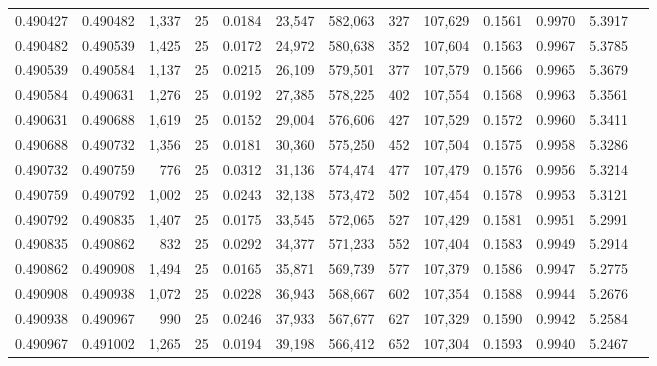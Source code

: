 \begin{tabular}{rrrrrrrrrrrrr}
0.490427 & 0.490482 & 1,337 &  25 &                                     0.0184 &  23,547 & 582,063 &     327 & 107,629 & 0.1561 & 0.9970 & 5.3917 \\
0.490482 & 0.490539 & 1,425 &  25 &                                     0.0172 &  24,972 & 580,638 &     352 & 107,604 & 0.1563 & 0.9967 & 5.3785 \\
0.490539 & 0.490584 & 1,137 &  25 &                                     0.0215 &  26,109 & 579,501 &     377 & 107,579 & 0.1566 & 0.9965 & 5.3679 \\
0.490584 & 0.490631 & 1,276 &  25 &                                     0.0192 &  27,385 & 578,225 &     402 & 107,554 & 0.1568 & 0.9963 & 5.3561 \\
0.490631 & 0.490688 & 1,619 &  25 &                                     0.0152 &  29,004 & 576,606 &     427 & 107,529 & 0.1572 & 0.9960 & 5.3411 \\
0.490688 & 0.490732 & 1,356 &  25 &                                     0.0181 &  30,360 & 575,250 &     452 & 107,504 & 0.1575 & 0.9958 & 5.3286 \\
0.490732 & 0.490759 &   776 &  25 &                                     0.0312 &  31,136 & 574,474 &     477 & 107,479 & 0.1576 & 0.9956 & 5.3214 \\
0.490759 & 0.490792 & 1,002 &  25 &                                     0.0243 &  32,138 & 573,472 &     502 & 107,454 & 0.1578 & 0.9953 & 5.3121 \\
0.490792 & 0.490835 & 1,407 &  25 &                                     0.0175 &  33,545 & 572,065 &     527 & 107,429 & 0.1581 & 0.9951 & 5.2991 \\
0.490835 & 0.490862 &   832 &  25 &                                     0.0292 &  34,377 & 571,233 &     552 & 107,404 & 0.1583 & 0.9949 & 5.2914 \\
0.490862 & 0.490908 & 1,494 &  25 &                                     0.0165 &  35,871 & 569,739 &     577 & 107,379 & 0.1586 & 0.9947 & 5.2775 \\
0.490908 & 0.490938 & 1,072 &  25 &                                     0.0228 &  36,943 & 568,667 &     602 & 107,354 & 0.1588 & 0.9944 & 5.2676 \\
0.490938 & 0.490967 &   990 &  25 &                                     0.0246 &  37,933 & 567,677 &     627 & 107,329 & 0.1590 & 0.9942 & 5.2584 \\
0.490967 & 0.491002 & 1,265 &  25 &                                     0.0194 &  39,198 & 566,412 &     652 & 107,304 & 0.1593 & 0.9940 & 5.2467 \\

\end{tabular}
